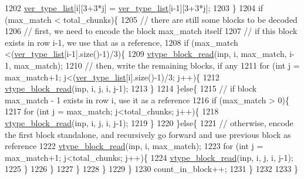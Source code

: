 \begin{DoxyCode}
1202         \hyperlink{classmarked__graph__compressed_af2e3e55223d436628a02758dfae88493}{ver\_type\_list}[i][3+3*j] = \hyperlink{classmarked__graph__compressed_af2e3e55223d436628a02758dfae88493}{ver\_type\_list}[i-1][3+3*j];
1203       \}
1204       \textcolor{keywordflow}{if} (max\_match < total\_chunks)\{
1205         \textcolor{comment}{// there are still some blocks to be decoded}
1206         \textcolor{comment}{// first, we need to encode the block max\_match itself}
1207         \textcolor{comment}{// if this block exists in row i-1, we use that as a reference,}
1208         \textcolor{keywordflow}{if} (max\_match <(\hyperlink{classmarked__graph__compressed_af2e3e55223d436628a02758dfae88493}{ver\_type\_list}[i-1].size()-1)/3)\{
1209           \hyperlink{classmarked__graph__compressed_a4bf8563a2dfd3038dc5833c014320487}{vtype\_block\_read}(inp, i, max\_match, i-1, max\_match);
1210           \textcolor{comment}{// then, write the remaining blocks, if any}
1211           \textcolor{keywordflow}{for} (\textcolor{keywordtype}{int} j = max\_match+1; j<(\hyperlink{classmarked__graph__compressed_af2e3e55223d436628a02758dfae88493}{ver\_type\_list}[i].size()-1)/3; j++)\{
1212             \hyperlink{classmarked__graph__compressed_a4bf8563a2dfd3038dc5833c014320487}{vtype\_block\_read}(inp, i, j, i, j-1);
1213           \}
1214         \}\textcolor{keywordflow}{else}\{
1215           \textcolor{comment}{// if block max\_match - 1 exists in row i, use it as a reference}
1216           \textcolor{keywordflow}{if} (max\_match > 0)\{
1217             \textcolor{keywordflow}{for} (\textcolor{keywordtype}{int} j = max\_match; j<total\_chunks; j++)\{
1218               \hyperlink{classmarked__graph__compressed_a4bf8563a2dfd3038dc5833c014320487}{vtype\_block\_read}(inp, i, j, i, j-1);
1219             \}
1220           \}\textcolor{keywordflow}{else}\{
1221             \textcolor{comment}{// otherwise, encode the first block standalone, and recursively go forward and use previous
       block as reference }
1222             \hyperlink{classmarked__graph__compressed_a4bf8563a2dfd3038dc5833c014320487}{vtype\_block\_read}(inp, i, max\_match);
1223             \textcolor{keywordflow}{for} (\textcolor{keywordtype}{int} j = max\_match+1; j<total\_chunks; j++)\{
1224               \hyperlink{classmarked__graph__compressed_a4bf8563a2dfd3038dc5833c014320487}{vtype\_block\_read}(inp, i, j, i, j-1);
1225             \}
1226           \}
1227         \}
1228       \}
1229     \}
1230     count\_in\_block++;
1231   \}
1232 
1233 \}
\end{DoxyCode}
\mbox{\label{classmarked__graph__compressed_a889749dd51bc37917a156e337eac142a}} 
